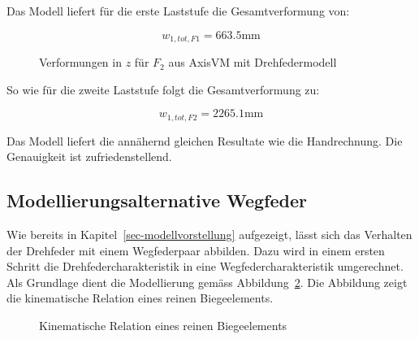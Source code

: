 \documentclass[
  11pt,
  letterpaper,
]{scrreprt}
\begin{document}
Das Modell liefert für die erste Laststufe die Gesamtverformung von:

\[
w_{1,tot,F1} = 663.5 \text{mm}
\]

\begin{figure}[H]


\caption{\label{fig-kragarm-drehfeder-215}Verformungen in \(z\) für
\(F_2\) aus AxisVM mit Drehfedermodell}

\end{figure}%

So wie für die zweite Laststufe folgt die Gesamtverformung zu:

\[
w_{1,tot,F2} = 2265.1 \text{mm}
\]

Das Modell liefert die annähernd gleichen Resultate wie die
Handrechnung. Die Genauigkeit ist zufriedenstellend.

\subsection{Modellierungsalternative
Wegfeder}\label{modellierungsalternative-wegfeder}

Wie bereits in Kapitel~\ref{sec-modellvorstellung} aufgezeigt, lässt
sich das Verhalten der Drehfeder mit einem Wegfederpaar abbilden. Dazu
wird in einem ersten Schritt die Drehfedercharakteristik in eine
Wegfedercharakteristik umgerechnet. Als Grundlage dient die Modellierung
gemäss Abbildung~\ref{fig-verdrehung_verformung}. Die Abbildung zeigt
die kinematische Relation eines reinen Biegeelements.

\begin{figure}[H]


\caption{\label{fig-verdrehung_verformung}Kinematische Relation eines
reinen Biegeelements}

\end{figure}%
\end{document}
